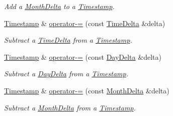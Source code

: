 \begin{DoxyCompactItemize}
\begin{DoxyCompactList}\small\item\em Add a \hyperlink{structMonthDelta}{Month\-Delta} to a \hyperlink{structTimestamp}{Timestamp}. \end{DoxyCompactList}\item 
\hyperlink{structTimestamp}{Timestamp} \& \hyperlink{structTimestamp_a49de64b0a5d62eaebf82920d5028a17f}{operator-\/=} (const \hyperlink{structTimeDelta}{Time\-Delta} \&delta)
\begin{DoxyCompactList}\small\item\em Subtract a \hyperlink{structTimeDelta}{Time\-Delta} from a \hyperlink{structTimestamp}{Timestamp}. \end{DoxyCompactList}\item 
\hyperlink{structTimestamp}{Timestamp} \& \hyperlink{structTimestamp_abec186416fd4391030d937664223b339}{operator-\/=} (const \hyperlink{structDayDelta}{Day\-Delta} \&delta)
\begin{DoxyCompactList}\small\item\em Subtract a \hyperlink{structDayDelta}{Day\-Delta} from a \hyperlink{structTimestamp}{Timestamp}. \end{DoxyCompactList}\item 
\hyperlink{structTimestamp}{Timestamp} \& \hyperlink{structTimestamp_a4b70395805808b8fe9de49b730daac16}{operator-\/=} (const \hyperlink{structMonthDelta}{Month\-Delta} \&delta)
\begin{DoxyCompactList}\small\item\em Subtract a \hyperlink{structMonthDelta}{Month\-Delta} from a \hyperlink{structTimestamp}{Timestamp}. \end{DoxyCompactList}\end{DoxyCompactItemize}
